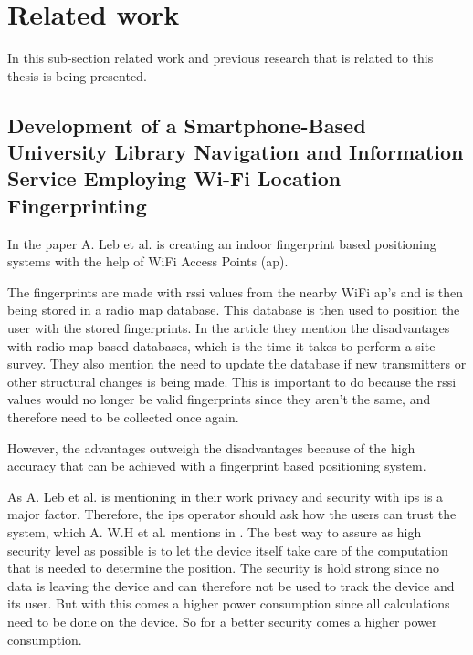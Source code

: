 \section{Related work}\label{sec:theoryRelatedWork}
In this sub-section related work and previous research that is related to this thesis is being presented.


\subsection{Development of a Smartphone-Based University Library Navigation and Information Service Employing Wi-Fi Location Fingerprinting}\label{sec:}
In the paper \cite{DevelopmentSmartphoneBasedUniversity2021} A. Leb et al. is creating an indoor fingerprint based positioning systems with the help of WiFi Access Points (\acrshort{ap}).

\bigskip

The fingerprints are made with \acrshort{rssi} values from the nearby WiFi \acrshort{ap}'s
and is then being stored in a radio map database.
This database is then used to position the user with the stored fingerprints.
In the article they mention the disadvantages with radio map based databases, which is the time it takes to perform a site survey.
They also mention the need to update the database if new transmitters or other structural changes is being made.
This is important to do because the \acrshort{rssi} values would no longer be valid fingerprints since they aren't the same, and therefore need to be collected once again.

\bigskip

However, the advantages outweigh the disadvantages because of the high accuracy that can be achieved with a fingerprint based positioning system.

\bigskip

As A. Leb et al. is mentioning in their work privacy and security with \acrfull{ips} is a major factor.
Therefore, the \acrshort{ips} operator should ask how the users can trust the system, which A. W.H et al. mentions in \cite{SurveyWirelessIndoor2019}.
The best way to assure as high security level as possible is to let the device itself take care of the computation that is needed to determine the position.
The security is hold strong since no data is leaving the device and can therefore not be used to track the device and its user.
But with this comes a higher power consumption since all calculations need to be done on the device.
So for a better security comes a higher power consumption.

